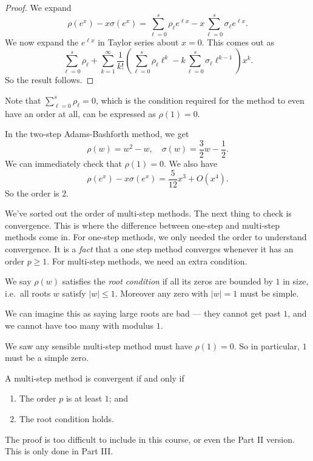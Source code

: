 \documentclass[a4paper]{article}
\begin{document}
\begin{proof}
  We expand
  \[
    \rho(e^x) - x \sigma(e^x) = \sum_{\ell = 0}^s \rho_\ell e^{\ell x} - x \sum_{\ell = 0}^s \sigma_\ell e^{\ell x}.
  \]
  We now expand the $e^{\ell x}$ in Taylor series about $x = 0$. This comes out as
  \[
    \sum_{\ell = 0}^s \rho_\ell + \sum_{k = 1}^\infty \frac{1}{k!} \left(\sum_{\ell = 0}^s \rho_\ell \ell^k - k \sum_{\ell = 0}^s \sigma_\ell \ell^{k - 1}\right) x^k.
  \]
  So the result follows.
\end{proof}
Note that $\sum_{\ell = 0}^s \rho_\ell = 0$, which is the condition required for the method to even have an order at all, can be expressed as $\rho(1) = 0$.

\begin{eg}[AB2]
  In the two-step Adams-Bashforth method, we get
  \[
    \rho(w) = w^2 - w,\quad \sigma(w) = \frac{3}{2} w - \frac{1}{2}.
  \]
  We can immediately check that $\rho(1) = 0$. We also have
  \[
    \rho(e^x) - x \sigma(e^x) = \frac{5}{12} x^3 + O(x^4).
  \]
  So the order is $2$.
\end{eg}

We've sorted out the order of multi-step methods. The next thing to check is convergence. This is where the difference between one-step and multi-step methods come in. For one-step methods, we only needed the order to understand convergence. It is a \emph{fact} that a one step method converges whenever it has an order $p \geq 1$. For multi-step methods, we need an extra condition.

\begin{defi}
  We say $\rho(w)$ satisfies the \emph{root condition} if all its zeros are bounded by $1$ in size, i.e.\ all roots $w$ satisfy $|w| \leq 1$. Moreover any zero with $|w| = 1$ must be simple.
\end{defi}
We can imagine this as saying large roots are bad --- they cannot get past $1$, and we cannot have too many with modulus $1$.

We saw any sensible multi-step method must have $\rho(1) = 0$. So in particular, $1$ must be a simple zero.

\begin{thm}
  A multi-step method is convergent if and only if
  \begin{enumerate}
    \item The order $p$ is at least $1$; and
    \item The root condition holds.
  \end{enumerate}
\end{thm}
The proof is too difficult to include in this course, or even the Part II version. This is only done in Part III.
\end{document}
